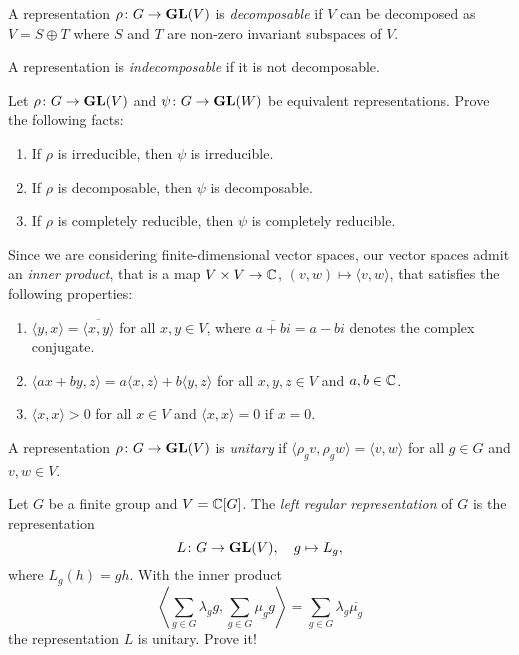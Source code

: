 \begin{definition}
A representation
$\rho\colon G\to\mathbf{GL}(V)$ is \emph{decomposable} if $V$ can be decomposed as $V=S\oplus T$
where $S$ and $T$ are non-zero invariant subspaces of $V$. 
\end{definition}

A representation is 
\emph{indecomposable} if it is not decomposable. 

\begin{exercise}
\label{xca:equivalence}
	Let $\rho\colon G\to\mathbf{GL}(V)$ and $\psi\colon G\to\mathbf{GL}(W)$ be equivalent representations.
	Prove the following facts:
	\begin{enumerate}
		\item If $\rho$ is irreducible, then $\psi$ is irreducible.
		\item If $\rho$ is decomposable, then $\psi$ is decomposable.
		\item If $\rho$ is completely reducible, then $\psi$ is completely reducible. 
	\end{enumerate}	
\end{exercise}

Since we are considering finite-dimensional vector spaces, our vector spaces admit 
an \emph{inner product}, that is a map $V\times V\to\mathbb{C}$, $(v,w)\mapsto\langle v,w\rangle$, 
that satisfies the following properties:
\begin{enumerate}
    \item $\langle y,x\rangle=\overline{\langle x,y\rangle}$ for all $x,y\in V$, where $\overline{a+bi}=a-bi$ denotes the complex conjugate.
    \item $\langle ax+by,z\rangle=a\langle x,z\rangle+b\langle y,z\rangle$ for all $x,y,z\in V$ and $a,b\in\mathbb{C}$.
    \item $\langle x,x\rangle>0$ for all $x\in V$ and $\langle x,x\rangle=0$ if $x=0$. 
\end{enumerate}

\begin{definition}
    A representation $\rho\colon G\to\mathbf{GL}(V)$ is \emph{unitary} if
    $\langle \rho_gv,\rho_gw\rangle=\langle v,w\rangle$ for all $g\in G$ and $v,w\in V$.
\end{definition}

\begin{example}
Let $G$ be a finite group and $V=\mathbb{C}[G]$. The \emph{left regular representation}
of $G$ is the representation
\[
L\colon G\to\mathbf{GL}(V),
\quad
g\mapsto L_g,
\]
where $L_g(h)=gh$. With the inner product
\[
\left\langle\sum_{g\in G}\lambda_gg,\sum_{g\in G}\mu_gg\right\rangle=\sum_{g\in G}\lambda_g\overline{\mu_g}
\]
the representation $L$ is unitary. Prove it! 
\end{example}



